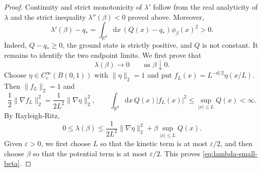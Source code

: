 \documentclass[11pt,reqno]{amsart}
\theoremstyle{definition}
\numberwithin{equation}{section}
\newcommand{\<}{\langle}
\renewcommand{\>}{\rangle}
\def\de{{\rm d}}
\def\de{{\mathrm {d}}}
\begin{document}
\begin{appendix}
\begin{proof}
Continuity and strict monotonicity of $\lambda'$ follow from the real
analyticity of $\lambda$ and the strict inequality $\lambda''(\beta)<0$
proved above.  Moreover,
\[
    \lambda'(\beta)-q_*
    =\int_{\mathbb R^d}\de x \, (Q(x)-q_*)\phi_\beta(x)^2>0.
\]
Indeed, $Q-q_*\geq0$, the ground state is strictly positive, and $Q$ is not
constant.  It remains to identify the two endpoint limits.
We first prove that
\begin{equation}
    \lambda(\beta)\longrightarrow0
    \qquad\text{as }\beta\downarrow0.
\label{eq:lambda-small-beta}
\end{equation}
Choose $\eta\in C_c^\infty(B(0,1))$ with $\|\eta\|_2=1$ and put
$f_L(x)=L^{-d/2}\eta(x/L)$.
Then $\|f_L\|_2=1$ and
\[
    \frac12\|\nabla f_L\|_2^2
    =\frac{1}{2L^2}\|\nabla\eta\|_2^2,
    \qquad
    \int_{\mathbb R^d} \de x \, Q(x)|f_L(x)|^2
    \leq \sup_{|x|\leq L}Q(x)<\infty.
\]
By Rayleigh-Ritz,
\[
    0\leq\lambda(\beta)
    \leq \frac{1}{2L^2}\|\nabla\eta\|_2^2
       +\beta\sup_{|x|\leq L}Q(x).
\]
Given $\varepsilon>0$, we first choose $L$ so that the kinetic term is at
most $\varepsilon/2$, and then choose $\beta$ so that the potential term is
at most $\varepsilon/2$.  This proves \eqref{eq:lambda-small-beta}.


\end{proof}
\end{appendix}
\end{document}
